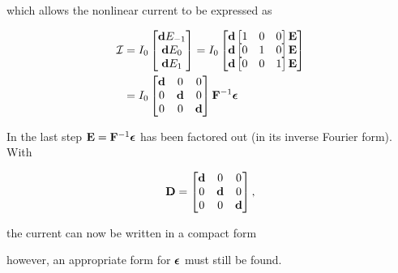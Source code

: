 which allows the nonlinear current to be expressed as

\begin{equation}\label{eqn:ece1254projectReport:900}
\begin{aligned}
\calI &=
I_0
\begin{bmatrix}
\Bd E_{-1} \\
\Bd E_{0} \\
\Bd E_{1} \\
\end{bmatrix}
=
I_0
\begin{bmatrix}
\Bd \begin{bmatrix} 1 & 0 & 0 \end{bmatrix} \BE \\
\Bd \begin{bmatrix} 0 & 1 & 0 \end{bmatrix} \BE \\
\Bd \begin{bmatrix} 0 & 0 & 1 \end{bmatrix} \BE
\end{bmatrix} \\
&=
I_0
\begin{bmatrix}
\Bd & 0 & 0 \\
0 & \Bd & 0 \\
0 & 0 & \Bd
\end{bmatrix}
\BF^{-1} \Bepsilon
\end{aligned}
\end{equation}

In the last step \( \mathbf{E} = \mathbf{F}^{-1} \boldsymbol{\epsilon} \) has been factored out (in its inverse Fourier form).
With

\begin{dmath}\label{eqn:ece1254projectReport:920}
\BD =
\begin{bmatrix}
\Bd & 0 & 0 \\
0 & \Bd & 0 \\
0 & 0   & \Bd \\
\end{bmatrix},
\end{dmath}

the current can now be written in a compact form


however, an appropriate form for \( \boldsymbol{\epsilon} \) must still be found.

